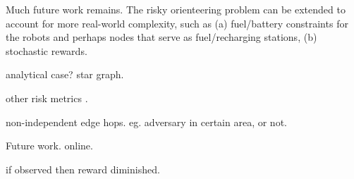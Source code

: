 \documentclass[11pt, oneside]{article}
\begin{document}
Much future work remains.
The risky orienteering problem can be extended to account for more real-world complexity, such as (a) fuel/battery constraints for the robots and perhaps nodes that serve as fuel/recharging stations, (b) stochastic rewards.


analytical case? star graph.

other risk metrics \cite{majumdar2020should}.

non-independent edge hops. eg. adversary in certain area, or not.

Future work. online.

if observed then reward diminished.




\end{document}
